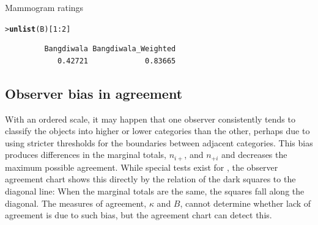 \documentclass[10pt,krantz2]{krantz}\usepackage[]{graphicx}\usepackage[]{color}
\makeatletter
\newcommand{\hlnum}[1]{\textcolor[rgb]{0.686,0.059,0.569}{#1}}%
\newcommand{\hlopt}[1]{\textcolor[rgb]{0,0,0}{#1}}%
\newcommand{\hlstd}[1]{\textcolor[rgb]{0.345,0.345,0.345}{#1}}%
\newcommand{\hlkwd}[1]{\textcolor[rgb]{0.737,0.353,0.396}{\textbf{#1}}}%
\newenvironment{kframe}{%
 \def\at@end@of@kframe{}%
 \ifinner\ifhmode%
  \def\at@end@of@kframe{\end{minipage}}%
  \begin{minipage}{\columnwidth}%
 \fi\fi%
 \def\FrameCommand##1{\hskip\@totalleftmargin \hskip-\fboxsep
 \colorbox{shadecolor}{##1}\hskip-\fboxsep
     \hskip-\linewidth \hskip-\@totalleftmargin \hskip\columnwidth}%
 \MakeFramed {\advance\hsize-\width
   \@totalleftmargin\z@ \linewidth\hsize
   \@setminipage}}%
 {\par\unskip\endMakeFramed%
 \at@end@of@kframe}
\newenvironment{knitrout}{}{} %
\renewenvironment{knitrout}{\small\renewcommand{\baselinestretch}{.85}}{} %
\makeatother
\begin{document}
\begin{Example}[mammograms]{Mammogram ratings}
\begin{knitrout}
\color{fgcolor}\begin{kframe}
\begin{alltt}
\hlstd{> }\hlkwd{unlist}\hlstd{(B)[}\hlnum{1} \hlopt{:} \hlnum{2}\hlstd{]}
\end{alltt}
\begin{verbatim}
         Bangdiwala Bangdiwala_Weighted 
            0.42721             0.83665 
\end{verbatim}
\end{kframe}
\end{knitrout}


\end{Example}
\subsection{Observer bias in agreement}\label{sec:twoway-observer}

With an ordered scale, it may happen that one observer consistently
tends to classify the objects into higher or lower categories than
the other, perhaps due to using stricter thresholds for the
boundaries between adjacent categories.
This bias produces differences in the marginal totals,
\(n_{i+}\), and \(n_{+i}\) and decreases the maximum possible agreement.
While special tests exist for
, the observer agreement chart shows this
directly by the relation of the dark squares to the diagonal line:
When the marginal totals are the same, the squares fall along the
diagonal.
The measures of agreement, $\kappa$ and $B$, cannot determine
whether lack of agreement is due to such bias, but the agreement chart can
detect this.
\end{document}
